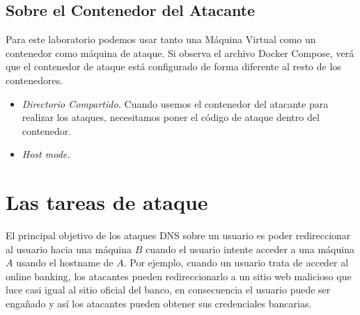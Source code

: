 



\subsection{Sobre el Contenedor del Atacante}

Para este laboratorio podemos usar tanto una Máquina Virtual como un contenedor como máquina de ataque. Si observa el archivo Docker Compose, verá que el contenedor de ataque está configurado de forma diferente al resto de los contenedores.


\begin{itemize}
\item \textit{Directorio Compartido.} Cuando usemos el contenedor del atacante para realizar los ataques, necesitamos poner el código de ataque dentro del contenedor.



\item \textit{Host mode.}

\end{itemize}










\section{Las tareas de ataque}

El principal objetivo de los ataques DNS sobre un usuario es poder redireccionar al usuario hacia una máquina $B$ cuando el usuario intente acceder a una máquina $A$ usando el hostname de $A$. Por ejemplo, cuando un usuario trata de acceder al online banking, los atacantes pueden redireccionarlo a un sitio web malicioso que luce casi igual al sitio oficial del banco, en consecuencia el usuario puede ser engañado y así los atacantes pueden obtener sus credenciales bancarias.


